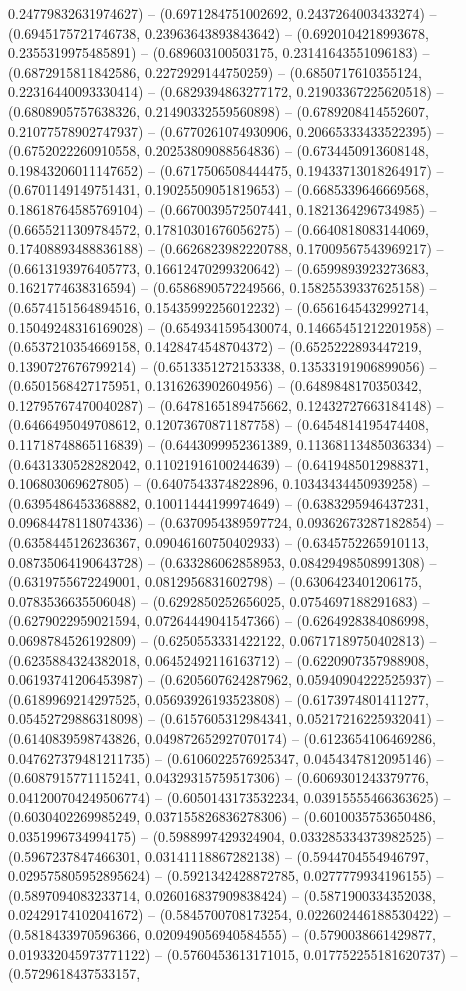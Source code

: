 0.24779832631974627) -- (0.6971284751002692, 0.2437264003433274) -- (0.6945175721746738, 0.23963643893843642) -- (0.6920104218993678, 0.2355319975485891) -- (0.689603100503175, 0.23141643551096183) -- (0.6872915811842586, 0.2272929144750259) -- (0.6850717610355124, 0.22316440093330414) -- (0.6829394863277172, 0.21903367225620518) -- (0.6808905757638326, 0.21490332559560898) -- (0.6789208414552607, 0.21077578902747937) -- (0.6770261074930906, 0.20665333433522395) -- (0.6752022260910558, 0.20253809088564836) -- (0.6734450913608148, 0.19843206011147652) -- (0.6717506508444475, 0.19433713018264917) -- (0.6701149149751431, 0.19025509051819653) -- (0.6685339646669568, 0.18618764585769104) -- (0.6670039572507441, 0.1821364296734985) -- (0.6655211309784572, 0.17810301676056275) -- (0.6640818083144069, 0.17408893488836188) -- (0.6626823982220788, 0.17009567543969217) -- (0.6613193976405773, 0.16612470299320642) -- (0.6599893923273683, 0.1621774638316594) -- (0.6586890572249566, 0.15825539337625158) -- (0.6574151564894516, 0.15435992256012232) -- (0.6561645432992714, 0.15049248316169028) -- (0.6549341595430074, 0.14665451212201958) -- (0.6537210354669158, 0.1428474548704372) -- (0.6525222893447219, 0.1390727676799214) -- (0.6513351272153338, 0.13533191906899056) -- (0.6501568427175951, 0.1316263902604956) -- (0.6489848170350342, 0.12795767470040287) -- (0.6478165189475662, 0.12432727663184148) -- (0.6466495049708612, 0.12073670871187758) -- (0.6454814195474408, 0.11718748865116839) -- (0.6443099952361389, 0.11368113485036334) -- (0.6431330528282042, 0.11021916100244639) -- (0.6419485012988371, 0.106803069627805) -- (0.6407543374822896, 0.10343434450939258) -- (0.6395486453368882, 0.10011444199974649) -- (0.6383295946437231, 0.09684478118074336) -- (0.6370954389597724, 0.09362673287182854) -- (0.6358445126236367, 0.09046160750402933) -- (0.6345752265910113, 0.08735064190643728) -- (0.633286062858953, 0.08429498508991308) -- (0.6319755672249001, 0.0812956831602798) -- (0.6306423401206175, 0.0783536635506048) -- (0.6292850252656025, 0.0754697188291683) -- (0.6279022959021594, 0.07264449041547366) -- (0.6264928384086998, 0.0698784526192809) -- (0.6250553331422122, 0.06717189750402813) -- (0.6235884324382018, 0.06452492116163712) -- (0.6220907357988908, 0.06193741206453987) -- (0.6205607624287962, 0.05940904222525937) -- (0.6189969214297525, 0.05693926193523808) -- (0.6173974801411277, 0.05452729886318098) -- (0.6157605312984341, 0.05217216225932041) -- (0.6140839598743826, 0.049872652927070174) -- (0.6123654106469286, 0.047627379481211735) -- (0.6106022576925347, 0.0454347812095146) -- (0.6087915771115241, 0.04329315759517306) -- (0.6069301243379776, 0.041200704249506774) -- (0.6050143173532234, 0.03915555466363625) -- (0.6030402269985249, 0.037155826836278306) -- (0.6010035753650486, 0.0351996734994175) -- (0.5988997429324904, 0.033285334373982525) -- (0.5967237847466301, 0.03141118867282138) -- (0.5944704554946797, 0.029575805952895624) -- (0.5921342428872785, 0.0277779934196155) -- (0.5897094083233714, 0.026016837909838424) -- (0.5871900334352038, 0.02429174102041672) -- (0.5845700708173254, 0.022602446188530422) -- (0.5818433970596366, 0.020949056940584555) -- (0.5790038661429877, 0.019332045973771122) -- (0.5760453613171015, 0.017752255181620737) -- (0.5729618437533157, 